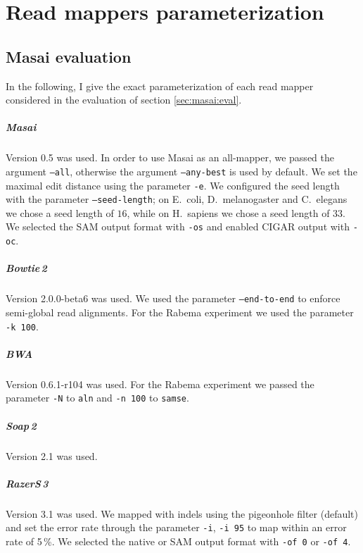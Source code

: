 \chapter{Read mappers parameterization}

\section{Masai evaluation}
\label{sup:masai:param}

In the following, I give the exact parameterization of each read mapper considered in the evaluation of section \ref{sec:masai:eval}.

\paragraph{Masai}
Version 0.5 was used.
In order to use Masai as an all-mapper, we passed the argument \texttt{--all}, otherwise the argument \texttt{--any-best} is used by default.
We set the maximal edit distance using the parameter \texttt{-e}.
We configured the seed length with the parameter \texttt{--seed-length}; on E.~coli, D.~melanogaster and C.~elegans we chose a seed length of $16$, while on H.~sapiens we chose a seed length of $33$.
We selected the SAM output format with \texttt{-os} and enabled CIGAR output with \texttt{-oc}.

\paragraph{Bowtie\,2}
Version 2.0.0-beta6 was used.
We used the parameter \texttt{--end-to-end} to enforce semi-global read alignments.
For the Rabema experiment we used the parameter \texttt{-k 100}.

\paragraph{BWA}
Version 0.6.1-r104 was used.
For the Rabema experiment we passed the parameter \texttt{-N} to \texttt{aln} and \texttt{-n 100} to \texttt{samse}.

\paragraph{Soap\,2}
Version 2.1 was used.

\paragraph{RazerS\,3}
Version 3.1 was used.
We mapped with indels using the pigeonhole filter (default) and set the error rate through the parameter \texttt{-i}, \eg \texttt{-i 95} to map within an error rate of 5\,\%.
We selected the native or SAM output format with \texttt{-of 0} or \texttt{-of 4}.

